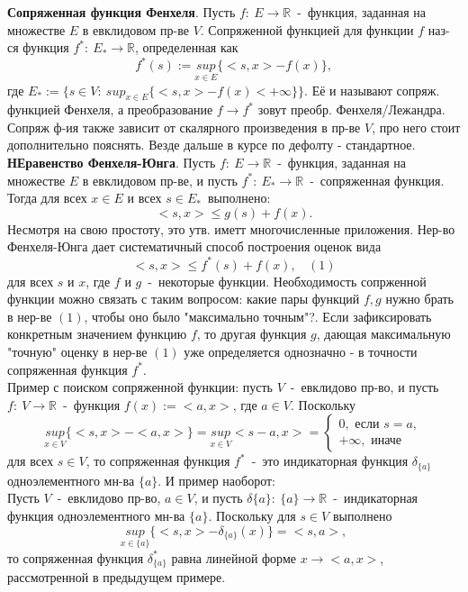 \textbf{Сопряженная функция Фенхеля}. Пусть $f:~E \to \mathbb{R}$~-~функция, заданная на множестве $E$ в евклидовом пр-ве $V$. Сопряженной функцией для функции $f$ наз-ся функция $f^{*}:~E_{*} \to \mathbb{R}$, определенная как
$$
f^{*}(s):=\underset{x \in E}{sup}\{<s,x>-f(x)\},
$$
где $E_{*}:=\{s \in V:~sup_{x \in E}\{<s,x>-f(x) < +\infty\}\}$. Её и называют сопряж. функцией Фенхеля, а преобразование $f \to f^{*}$ зовут преобр. Фенхеля/Лежандра.\\
Сопряж ф-ия также зависит от скалярного произведения в пр-ве $V$, про него стоит дополнительно пояснять. Везде дальше в курсе по дефолту - стандартное.\\

\textbf{НЕравенство Фенхеля-Юнга}. Пусть $f:~E \to \mathbb{R}$~-~функция, заданная на множестве $E$ в евклидовом пр-ве, и пусть $f^{*}:~E_{*} \to \mathbb{R}$~-~сопряженная функция. Тогда для всех $x \in E$ и всех $s \in E_{*}$~выполнено:
$$
<s,x> \leq g(s) + f(x).
$$
Несмотря на свою простоту, это утв. иметт многочисленные приложения. Нер-во Фенхеля-Юнга дает систематичный способ построения оценок вида
$$
<s,x> \leq f^{*}(s)+f(x),~~~~(1)
$$
для всех $s$ и $x$, где $f$ и $g$~-~некоторые функции. Необходимость сопрженной функции можно связать с таким вопросом: какие пары функций $f,g$ нужно брать в нер-ве $(1)$, чтобы оно было "максимально точным"?. Если зафиксировать конкретным значением функцию $f$, то другая функция $g$, дающая максимальную "точную" оценку в нер-ве $(1)$ уже определяется однозначно - в точности сопряженная функция $f^{*}$.\\
Пример с поиском сопряженной функции: пусть $V$~-~евклидово пр-во, и пусть $f:~V \to \mathbb{R}$~-~функция $f(x):=<a,x>$, где $a \in V$. Поскольку
$$
\underset{x \in V}{sup}\{<s,x>-<a,x>\}=\underset{x \in V}{sup}<s-a,x>=\begin{cases}
0,\text{~если~}s=a,\\
+\infty,\text{~иначе~}
\end{cases}
$$
для всех $s \in V$, то сопряженная функция $f^{*}$~-~это индикаторная функция $\delta_{\{a\}}$ одноэлементного мн-ва $\{a\}$. И пример наоборот:\\

Пусть $V$~-~евклидово пр-во, $a \in V$, и пусть $\delta{\{a\}}:~\{a\} \to \mathbb{R}$~-~индикаторная функция одноэлементного мн-ва $\{a\}$. Поскольку для $s \in V$ выполнено
$$
\underset{x \in \{a\}}{sup}\{<s,x>-\delta_{\{a\}}(x)\}=<s,a>,
$$
то сопряженная функция $\delta^{*}_{\{a\}}$ равна линейной форме $x \to <a,x>$, рассмотренной в предыдущем примере.\\

